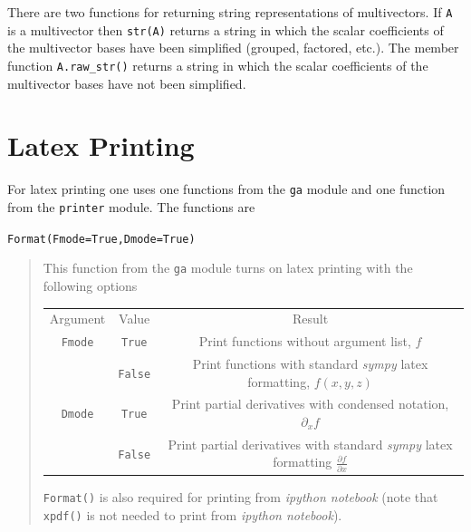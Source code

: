 \documentclass[12pt]{report}
\newcommand{\lp}{\left (}
\newcommand{\rp}{\right )}
\newcommand{\f}[2]{{#1}\lp {#2} \rp}
\newcommand{\T}[1]{\texttt{#1}}
\begin{document}
There are two functions for returning string representations of multivectors.  If \T{A} is a multivector then \T{str(A)} returns a string in which the 
scalar coefficients of the multivector bases have been simplified (grouped, factored, etc.).  The member function \T{A.raw\_str()} returns a string in
which the scalar coefficients of the multivector bases have not been simplified.

\section{Latex Printing}\label{LatexPrinting}

For latex printing one uses one functions from the \T{ga} module and one
function from the \T{printer} module.  The
functions are

\T{Format(Fmode=True,Dmode=True)}
\begin{quote}
   This function from the \T{ga} module turns on latex printing with the
   following options

\begin{tabular}{ccc}
         Argument &  Value &  Result \\
         \T{Fmode} &  \T{True} &  Print functions without argument list, $f$ \\
               &  \T{False} &  Print functions with standard \emph{sympy} latex formatting, $\f{f}{x,y,z}$ \\
         \T{Dmode} &  \T{True} &  Print partial derivatives with condensed notation, $\partial_{x}f$ \\
               &  \T{False} &  Print partial derivatives with standard \emph{sympy} latex formatting $\frac{\partial f}{\partial x}$ \\
\end{tabular}

	\T{Format()} is also required for printing from \emph{ipython notebook} (note that \T{xpdf()} is not needed to print from \emph{ipython notebook}).
\end{quote}
\end{document}
